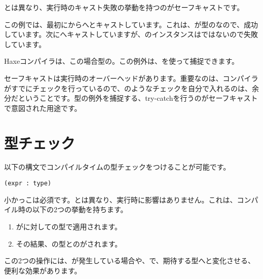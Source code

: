 とは異なり、実行時のキャスト失敗の挙動を持つのがセーフキャストです。


この例では、最初にからへとキャストしています。これは、が型のなので、成功しています。次にへキャストしていますが、のインスタンスはではないので失敗しています。

Haxeコンパイラは、この場合型の。この例外は、を使って捕捉できます。

セーフキャストは実行時のオーバーヘッドがあります。重要なのは、コンパイラがすでにチェックを行っているので、のようなチェックを自分で入れるのは、余分だということです。型の例外を捕捉する、try-catchを行うのがセーフキャストで意図された用途です。

\section{型チェック}
\label{expression-type-check}

以下の構文でコンパイルタイムの型チェックをつけることが可能です。

\begin{lstlisting}
(expr : type)
\end{lstlisting}

小かっこは必須です。とは異なり、実行時に影響はありません。これは、コンパイル時の以下の2つの挙動を持ちます。

\begin{enumerate}
\item {}がに対しての型で適用されます。
\item その結果、の型とのがされます。
\end{enumerate}

この2つの操作には、が発生している場合や、で、期待する型へと変化させる、便利な効果があります。
